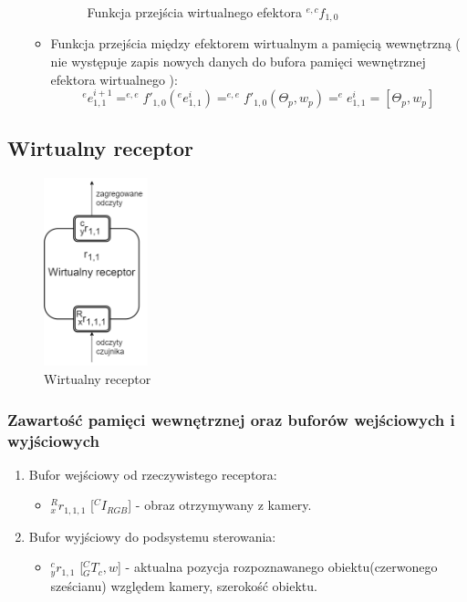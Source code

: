 \documentclass{article}
\begin{document}
\begin{itemize}
\begin{itemize}
\begin{figure}[H]
	\caption{Funkcja przej\'scia wirtualnego efektora $^{e,c}f_{1,0}$}
	\label{fig::WE_funkcje2v2}
\end{figure}
\item Funkcja przej\'scia między efektorem wirtualnym a pamięcią wewnętrzną ( nie występuje zapis nowych danych do bufora pamięci wewnętrznej efektora wirtualnego ):
\[^ee^{i+1}_{1,1}=^{e,e}f'_{1,0}(^ee_{1,1}^{i})=^{e,e}f'_{1,0}(\Theta_p,w_p)=^ee_{1,1}^{i}=[ \Theta_p, w_p ] \]
\end{itemize}
\end{itemize}


\subsection{Wirtualny receptor}
\begin{figure}[H]
	\centering
	\includegraphics[width=0.27\textwidth]{wirtualny_receptor.png}
	\caption{Wirtualny receptor}
	\label{fig::wirtualny_receptor}
\end{figure}

\subsubsection{Zawarto\'sć pamięci wewnętrznej oraz buforów wej\'sciowych i wyj\'sciowych}

\begin{enumerate}
\item Bufor wej\'sciowy od rzeczywistego receptora:
\begin{itemize}
\item $^R_xr_{1,1,1}$ [$^CI_{RGB}$] - obraz otrzymywany z kamery.
\end{itemize}
\item Bufor wyj\'sciowy do podsystemu sterowania:
\begin{itemize}
\item $^c_yr_{1,1}$ [$^C_GT_c, w$] - aktualna pozycja rozpoznawanego obiektu(czerwonego sze\'scianu) względem kamery, szeroko\'sć obiektu.
\end{itemize}
\end{enumerate}
\end{document}
